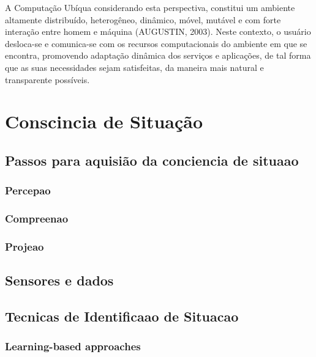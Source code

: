 \documentclass[12pt,a4paper,compsoc]{IEEEtran}
\begin{document}
A Computação Ubíqua considerando esta perspectiva, constitui um ambiente altamente distribuído, heterogêneo, dinâmico, móvel, mutável e com forte interação entre homem e máquina (AUGUSTIN, 2003). Neste contexto, o usuário desloca-se e comunica-se com os recursos computacionais do ambiente em que se encontra, promovendo adaptação dinâmica dos serviços e aplicações, de tal forma que as suas necessidades sejam satisfeitas, da maneira mais natural e transparente possíveis.



\section{Conscincia de Situação}







\subsection{Passos para aquisião da conciencia de situaao}

\subsubsection{Percepao}
\subsubsection{Compreenao}
\subsubsection{Projeao}

\subsection{Sensores e dados}

\subsection{Tecnicas de Identificaao de Situacao}

\subsubsection{Learning-based approaches}
\end{document}
